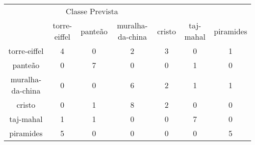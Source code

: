 \begin{tabular}{|c|c|c|c|c|c|c|}
\hline
\multicolumn{5}{|c|}{Classe Prevista}\\
 & torre-eiffel & panteão & muralha-da-china & cristo & taj-mahal & piramides\\
torre-eiffel & 4 & 0 & 2 & 3 & 0 & 1\\
panteão & 0 & 7 & 0 & 0 & 1 & 0\\
muralha-da-china & 0 & 0 & 6 & 2 & 1 & 1\\
cristo & 0 & 1 & 8 & 2 & 0 & 0\\
taj-mahal & 1 & 1 & 0 & 0 & 7 & 0\\
piramides & 5 & 0 & 0 & 0 & 0 & 5\\
\end{tabular}

